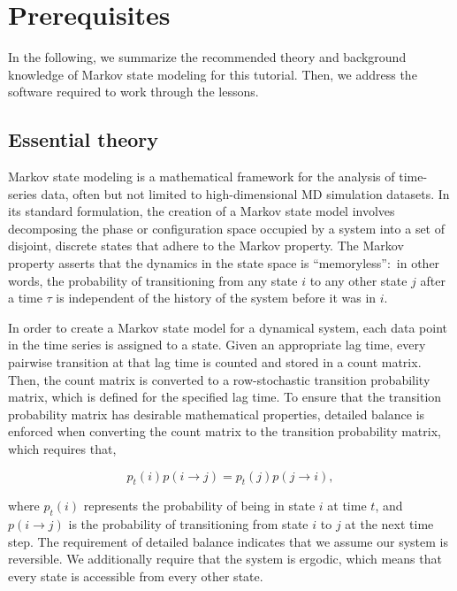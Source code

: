 \documentclass[9pt,tutorial]{livecoms}
\begin{document}
\section{Prerequisites}

In the following, we summarize the recommended theory and background knowledge of Markov state modeling for this tutorial.
Then, we address the software required to work through the lessons.

\subsection{Essential theory}
\label{sec:theory}

Markov state modeling is a mathematical framework for the analysis of time-series data, often but not limited to high-dimensional MD simulation datasets.
In its standard formulation, the creation of a Markov state model involves decomposing the phase or configuration space occupied by a system into a set of disjoint, discrete states that adhere to the Markov property.
The Markov property asserts that the dynamics in the state space is ``memoryless'':~in other words, the probability of transitioning from any state $i$ to any other state $j$ after a time $\tau$ is independent of the history of the system before it was in $i$.

In order to create a Markov state model for a dynamical system, each data point in the time series is assigned to a state.
Given an appropriate lag time, every pairwise transition at that lag time is counted and stored in a count matrix.
Then, the count matrix is converted to a row-stochastic transition probability matrix, which is defined for the specified lag time.
To ensure that the transition probability matrix has desirable mathematical properties, detailed balance is enforced when converting the count matrix to the transition probability matrix, which requires that,

\begin{equation}
\label{eq:balance}
p_t(i) p(i \rightarrow j) = p_t(j)p(j \rightarrow i),
\end{equation}

\noindent{}where $p_t(i)$ represents the probability of being in state $i$ at time $t$, and $p(i \rightarrow j)$ is the probability of transitioning from state $i$ to $j$ at the next time step.
The requirement of detailed balance indicates that we assume our system is reversible.
We additionally require that the system is ergodic, which means that every state is accessible from every other state.
\end{document}

